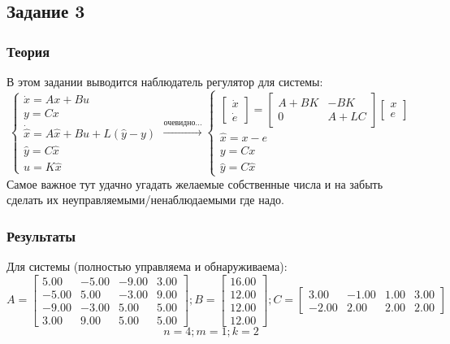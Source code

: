 \subsection{Задание 3}

\subsubsection{Теория}
В этом задании выводится наблюдатель регулятор для системы:
\[
        \begin{cases}
                \dot{x} = A x + B u\\
                y = C x \\
                \dot{\hat{x}} = A \hat{x} + B u + L(\hat{y} - y) \\
                \hat{y} = C \hat{x} \\
                u = K \hat{x}
        \end{cases} \xrightarrow{\text{очевидно...}}
        \begin{cases}
            \begin{bmatrix} 
                \dot{x} \\
                \dot{e}
            \end{bmatrix} = 
            \begin{bmatrix} 
                A + BK & -BK\\
                0 & A + LC
            \end{bmatrix}
            \begin{bmatrix} 
              x \\
              e
          \end{bmatrix} 
            \\
            \hat{x} = x - e \\
            y = Cx \\
            \hat{y} = C \hat{x}
         \end{cases}
\]
Самое важное тут удачно угадать желаемые собственные числа и на забыть сделать их неуправляемыми/ненаблюдаемыми где надо.
\subsubsection{Результаты}
Для системы (полностью управляема и обнаруживаема):
\[
    A = \begin{bmatrix}
        5.00 & -5.00 & -9.00 &  3.00\\
       -5.00 &  5.00 & -3.00 &  9.00\\
       -9.00 & -3.00 &  5.00 &  5.00\\
        3.00 &  9.00 &  5.00 &  5.00
      \end{bmatrix};
    B = \begin{bmatrix}
        16.00\\
        12.00\\
        12.00\\
        12.00
      \end{bmatrix};
    C = \begin{bmatrix}
        3.00 & -1.00 &  1.00 &  3.00\\
       -2.00 &  2.00 &  2.00 &  2.00
      \end{bmatrix}
\]
\[n = 4; m = 1; k = 2\]

